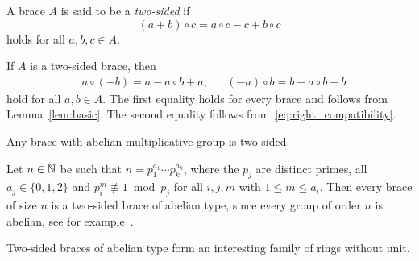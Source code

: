 
\begin{definition}
	A brace $A$ is said to be a \emph{two-sided} if 
	\begin{equation}
	\label{eq:right_compatibility}
	(a+b)\circ c=a\circ c-c+b\circ c
	\end{equation}
	holds for all $a,b,c\in A$. 
\end{definition}

If $A$ is a two-sided brace, then 
\begin{align}
\label{eq:2sided}
&a\circ(-b)=a-a\circ b+a,
&&(-a)\circ b=b-a\circ b+b    
\end{align}
hold for all $a,b\in A$. The first equality holds for every brace and follows from Lemma~\ref{lem:basic}. 
The second equality follows from~\eqref{eq:right_compatibility}. 

\begin{example}
  Any brace with abelian multiplicative group is 
  two-sided.
\end{example}

\begin{example}
  Let $n\in\mathbb{N}$ be such that $n=p_1^{a_1}\cdots p_k^{a_k}$, where the $p_j$ are
  distinct primes, all $a_j\in\{0,1,2\}$ and $p_i^m\not\equiv 1\bmod{p_j}$ for
  all $i,j,m$ with $1\leq m\leq a_i$. Then every brace of size $n$ is a
  two-sided brace of abelian type, since every group of order $n$ is abelian, see for
  example~\cite{MR1786236}.  
\end{example}

Two-sided braces of abelian type form an interesting family of rings without unit. 

